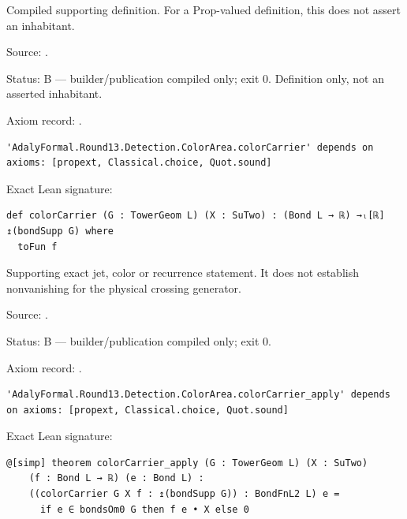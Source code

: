 \begin{definition}[bp-518]
\label{bp-518}
\uses{}
\leanok
Compiled supporting definition. For a Prop-valued definition, this does not assert an inhabitant.

\par Source: \texttt{}.
\par Status: B — builder/publication compiled only; exit 0. Definition only, not an asserted inhabitant.
\par Axiom record: \texttt{}.
\begin{verbatim}
'AdalyFormal.Round13.Detection.ColorArea.colorCarrier' depends on axioms: [propext, Classical.choice, Quot.sound]
\end{verbatim}
\par Exact Lean signature:
\begin{verbatim}
def colorCarrier (G : TowerGeom L) (X : SuTwo) : (Bond L → ℝ) →ₗ[ℝ] ↥(bondSupp G) where
  toFun f
\end{verbatim}
\end{definition}

\begin{theorem}[bp-519]
\label{bp-519}
\leanok
Supporting exact jet, color or recurrence statement. It does not establish nonvanishing for the physical crossing generator.

\par Source: \texttt{}.
\par Status: B — builder/publication compiled only; exit 0.
\par Axiom record: \texttt{}.
\begin{verbatim}
'AdalyFormal.Round13.Detection.ColorArea.colorCarrier_apply' depends on axioms: [propext, Classical.choice, Quot.sound]
\end{verbatim}
\par Exact Lean signature:
\begin{verbatim}
@[simp] theorem colorCarrier_apply (G : TowerGeom L) (X : SuTwo)
    (f : Bond L → ℝ) (e : Bond L) :
    ((colorCarrier G X f : ↥(bondSupp G)) : BondFnL2 L) e =
      if e ∈ bondsOm0 G then f e • X else 0
\end{verbatim}
\end{theorem}


